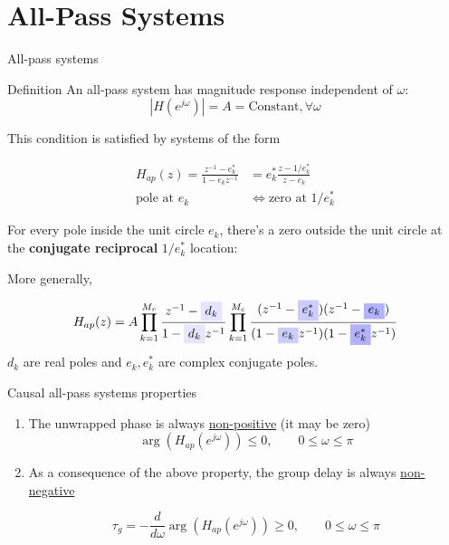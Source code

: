 \documentclass[10pt]{beamer}
\begin{document}
\section{All-Pass Systems}
\begin{frame}{All-pass systems}

\begin{block}{Definition}
	An all-pass system has magnitude response independent of $\omega$:
	\begin{equation*}
	|H(e^{j\omega})| = A = \text{Constant}, \forall \omega
	\end{equation*}
\end{block}

This condition is satisfied by systems of the form

\begin{align*}
H_{ap}(z) = \frac{z^{-1} - e_k^*}{1 - e_kz^{-1}} &= e_k^*\frac{z - 1/e_k^*}{z - e_k} \\
\text{pole at $e_k$} &\Longleftrightarrow \text{zero at $1/e_k^*$} 
\end{align*}

For every pole inside the unit circle $e_k$, there's a zero outside the unit circle at the \textbf{conjugate reciprocal} $1/e_k^*$ location:

More generally,

\begin{align*}
H_{ap}(z) = A\prod_{k = 1}^{M_r}\frac{z^{-1} - \tikz[baseline]{\node[fill=blue!10,anchor=base] {$d_k$};}}{1 - \tikz[baseline]{\node[fill=blue!10,anchor=base] {$d_k$};}z^{-1}}\prod_{k = 1}^{M_c}\frac{(z^{-1} - \tikz[baseline]{\node[fill=blue!20,anchor=base] {$e^*_k$};})(z^{-1} - \tikz[baseline]{\node[fill=blue!30,anchor=base] {$e_k$};})}{(1 - \tikz[baseline]{\node[fill=blue!20,anchor=base] {$e_k$};}z^{-1})(1 - \tikz[baseline]{\node[fill=blue!30,anchor=base] {$e^*_k$};}z^{-1})}
\end{align*}
$d_k$ are real poles and $e_k, e^*_k$ are complex conjugate poles.
\end{frame}

\begin{frame}{Causal all-pass systems properties}
\begin{enumerate}
	\item The unwrapped phase is always \underline{non-positive} (it may be zero)
	\begin{equation*}
	\arg(H_{ap}(e^{j\omega})) \leq 0, \qquad 0 \leq \omega\leq\pi
	\end{equation*}
	\item As a consequence of the above property, the group delay is always \underline{non-negative}
	
	\begin{equation*}
	\tau_g = -\dfrac{d}{d\omega}\arg(H_{ap}(e^{j\omega})) \geq 0, \qquad 0 \leq \omega\leq\pi
	\end{equation*} 
	
\end{enumerate}
\end{frame}
\end{document}
